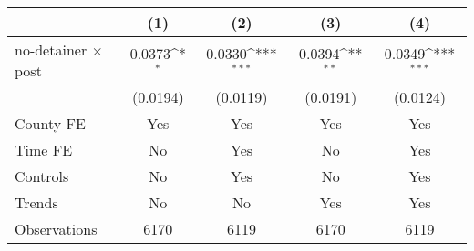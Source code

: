 {
\def\sym#1{\ifmmode^{#1}\else\(^{#1}\)\fi}
\begin{tabular}{l*{4}{c}}
\hline\hline
                    &\multicolumn{1}{c}{(1)}         &\multicolumn{1}{c}{(2)}         &\multicolumn{1}{c}{(3)}         &\multicolumn{1}{c}{(4)}         \\
\hline
no-detainer $\times$ post&      0.0373\sym{*}  &      0.0330\sym{***}&      0.0394\sym{**} &      0.0349\sym{***}\\
                    &    (0.0194)         &    (0.0119)         &    (0.0191)         &    (0.0124)         \\
[1em]
County FE           &         Yes         &         Yes         &         Yes         &         Yes         \\
[1em]
Time FE             &          No         &         Yes         &          No         &         Yes         \\
[1em]
Controls            &          No         &         Yes         &          No         &         Yes         \\
[1em]
Trends              &          No         &          No         &         Yes         &         Yes         \\
\hline
Observations        &        6170         &        6119         &        6170         &        6119         \\
\hline\hline
\end{tabular}
}
